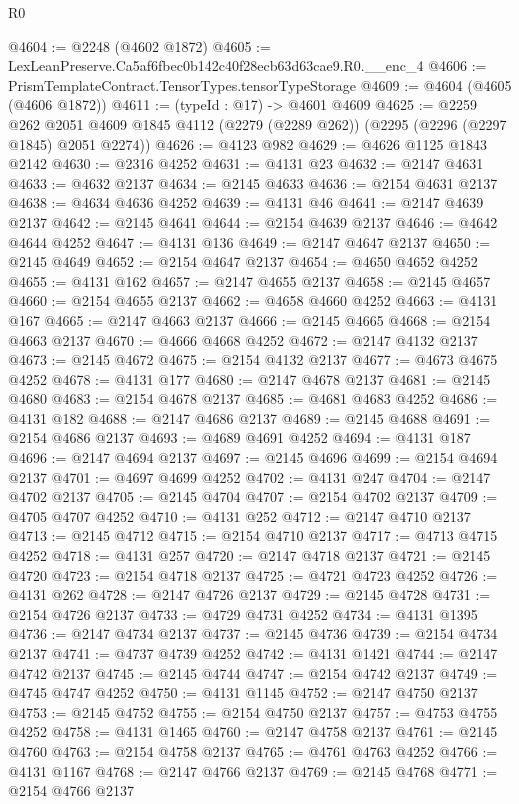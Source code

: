 \begin{lexlean}{R0}
\begin{coremodule}
@4604 := @2248 (@4602 @1872)
@4605 := LexLeanPreserve.Ca5af6fbec0b142c40f28ecb63d63cae9.R0.__enc_4
@4606 := PrismTemplateContract.TensorTypes.tensorTypeStorage
@4609 := @4604 (@4605 (@4606 @1872))
@4611 := (typeId : @17) -> @4601 @4609
@4625 := @2259
    @262
    @2051
    @4609
    @1845
    @4112
    (@2279 (@2289 @262))
    (@2295 (@2296 (@2297 @1845) @2051 @2274))
@4626 := @4123 @982
@4629 := @4626 @1125 @1843 @2142
@4630 := @2316 @4252
@4631 := @4131 @23
@4632 := @2147 @4631
@4633 := @4632 @2137
@4634 := @2145 @4633
@4636 := @2154 @4631 @2137
@4638 := @4634 @4636 @4252
@4639 := @4131 @46
@4641 := @2147 @4639 @2137
@4642 := @2145 @4641
@4644 := @2154 @4639 @2137
@4646 := @4642 @4644 @4252
@4647 := @4131 @136
@4649 := @2147 @4647 @2137
@4650 := @2145 @4649
@4652 := @2154 @4647 @2137
@4654 := @4650 @4652 @4252
@4655 := @4131 @162
@4657 := @2147 @4655 @2137
@4658 := @2145 @4657
@4660 := @2154 @4655 @2137
@4662 := @4658 @4660 @4252
@4663 := @4131 @167
@4665 := @2147 @4663 @2137
@4666 := @2145 @4665
@4668 := @2154 @4663 @2137
@4670 := @4666 @4668 @4252
@4672 := @2147 @4132 @2137
@4673 := @2145 @4672
@4675 := @2154 @4132 @2137
@4677 := @4673 @4675 @4252
@4678 := @4131 @177
@4680 := @2147 @4678 @2137
@4681 := @2145 @4680
@4683 := @2154 @4678 @2137
@4685 := @4681 @4683 @4252
@4686 := @4131 @182
@4688 := @2147 @4686 @2137
@4689 := @2145 @4688
@4691 := @2154 @4686 @2137
@4693 := @4689 @4691 @4252
@4694 := @4131 @187
@4696 := @2147 @4694 @2137
@4697 := @2145 @4696
@4699 := @2154 @4694 @2137
@4701 := @4697 @4699 @4252
@4702 := @4131 @247
@4704 := @2147 @4702 @2137
@4705 := @2145 @4704
@4707 := @2154 @4702 @2137
@4709 := @4705 @4707 @4252
@4710 := @4131 @252
@4712 := @2147 @4710 @2137
@4713 := @2145 @4712
@4715 := @2154 @4710 @2137
@4717 := @4713 @4715 @4252
@4718 := @4131 @257
@4720 := @2147 @4718 @2137
@4721 := @2145 @4720
@4723 := @2154 @4718 @2137
@4725 := @4721 @4723 @4252
@4726 := @4131 @262
@4728 := @2147 @4726 @2137
@4729 := @2145 @4728
@4731 := @2154 @4726 @2137
@4733 := @4729 @4731 @4252
@4734 := @4131 @1395
@4736 := @2147 @4734 @2137
@4737 := @2145 @4736
@4739 := @2154 @4734 @2137
@4741 := @4737 @4739 @4252
@4742 := @4131 @1421
@4744 := @2147 @4742 @2137
@4745 := @2145 @4744
@4747 := @2154 @4742 @2137
@4749 := @4745 @4747 @4252
@4750 := @4131 @1145
@4752 := @2147 @4750 @2137
@4753 := @2145 @4752
@4755 := @2154 @4750 @2137
@4757 := @4753 @4755 @4252
@4758 := @4131 @1465
@4760 := @2147 @4758 @2137
@4761 := @2145 @4760
@4763 := @2154 @4758 @2137
@4765 := @4761 @4763 @4252
@4766 := @4131 @1167
@4768 := @2147 @4766 @2137
@4769 := @2145 @4768
@4771 := @2154 @4766 @2137

\end{coremodule}
\end{lexlean}
